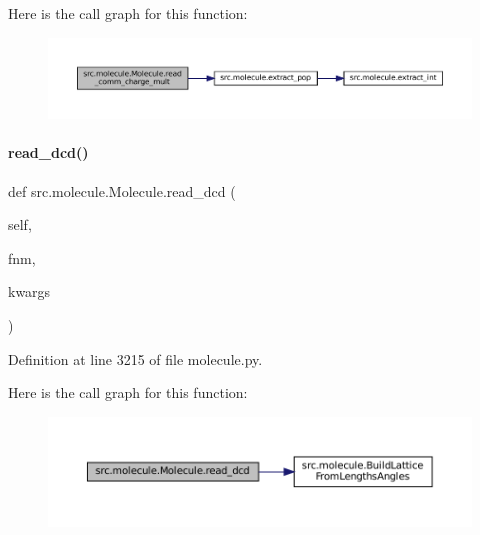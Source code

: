Here is the call graph for this function\+:
\nopagebreak
\begin{figure}[H]
\begin{center}
\leavevmode
\includegraphics[width=350pt]{classsrc_1_1molecule_1_1Molecule_a7aeff86c1d2b8f73bea9191b33f665c3_cgraph}
\end{center}
\end{figure}
\mbox{\label{classsrc_1_1molecule_1_1Molecule_a258bc7b495910f9ff3bb552413207ecd}} 
\paragraph{\texorpdfstring{read\+\_\+dcd()}{read\_dcd()}}
{\footnotesize\ttfamily def src.\+molecule.\+Molecule.\+read\+\_\+dcd (\begin{DoxyParamCaption}\item[{}]{self,  }\item[{}]{fnm,  }\item[{}]{kwargs }\end{DoxyParamCaption})}



Definition at line 3215 of file molecule.\+py.

Here is the call graph for this function\+:
\nopagebreak
\begin{figure}[H]
\begin{center}
\leavevmode
\includegraphics[width=350pt]{classsrc_1_1molecule_1_1Molecule_a258bc7b495910f9ff3bb552413207ecd_cgraph}
\end{center}
\end{figure}
\mbox{\label{classsrc_1_1molecule_1_1Molecule_a4ce0cfbb42e84ec2fe5d8097d0ff5fda}} 
